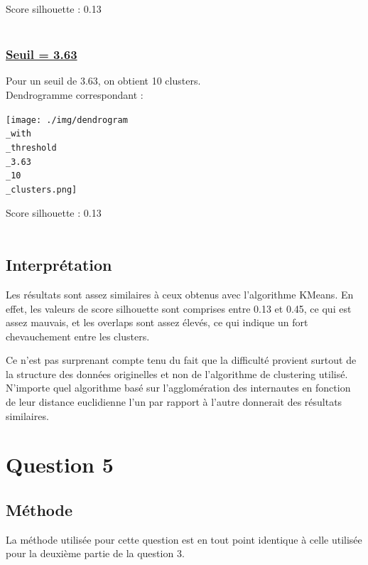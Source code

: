 \documentclass{article}
\begin{document}
\noindent Score silhouette : 0.13\\\\

\subsubsection*{\underline{Seuil = 3.63}}
Pour un seuil de 3.63, on obtient 10 clusters.\\
Dendrogramme correspondant :

\begin{center}
    \texttt{[image: ./img/dendrogram\\\_with\\\_threshold\\\_3.63\\\_10\\\_clusters.png]}
\end{center}

\noindent Score silhouette : 0.13\\\\
\subsection*{Interprétation}

Les résultats sont assez similaires à ceux obtenus avec l'algorithme KMeans. En effet, les valeurs
de score silhouette sont comprises entre 0.13 et 0.45, ce qui est assez mauvais, et les overlaps
sont assez élevés, ce qui indique un fort chevauchement entre les clusters.

Ce n'est pas surprenant compte tenu du fait que la difficulté provient surtout de la structure
des données originelles et non de l'algorithme de clustering utilisé. N'importe quel algorithme
basé sur l'agglomération des internautes en fonction de leur distance euclidienne 
l'un par rapport à l'autre donnerait des résultats similaires.

\newpage

\section*{Question 5}

\subsection*{Méthode}

La méthode utilisée pour cette question est en tout point identique à celle utilisée pour la
deuxième partie de la question 3.
\end{document}

